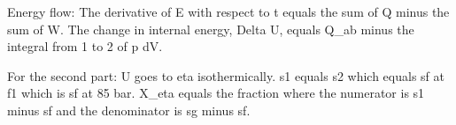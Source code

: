 Energy flow:
The derivative of E with respect to t equals the sum of Q minus the sum of W.
The change in internal energy, Delta U, equals Q_ab minus the integral from 1 to 2 of p dV.

For the second part:
U goes to eta isothermically.
s1 equals s2 which equals sf at f1 which is sf at 85 bar.
X_eta equals the fraction where the numerator is s1 minus sf and the denominator is sg minus sf.
